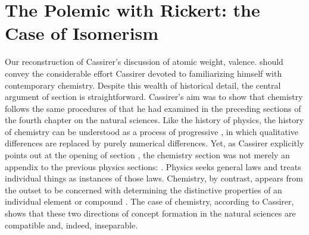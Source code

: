 \documentclass[submitted,12pt]{article}
\begin{document}
\section{The Polemic with Rickert: the Case of Isomerism}
\label{sec:rickert}



Our reconstruction of Cassirer's discussion of atomic weight, valence\etc. should convey the considerable effort Cassirer devoted to familiarizing himself with contemporary chemistry. Despite this wealth of historical detail, the central argument of section  is straightforward. Cassirer's aim was to show that chemistry follows the same procedures of   that he had examined in the preceding sections of the fourth chapter on the natural sciences. Like the history of physics, the history of chemistry can be understood as a process of progressive , in which qualitative differences are replaced by purely numerical differences. Yet, as Cassirer explicitly points out at the opening of section , the chemistry section was not merely an appendix to the previous physics sections:  . Physics seeks general laws and treats individual things as instances of those laws. Chemistry, by contrast, appears from the outset to be concerned with determining the distinctive properties of an individual element or compound  . The case of chemistry, according to Cassirer, shows that these two directions of concept formation in the natural sciences are compatible and, indeed, inseparable. 


\end{document}
